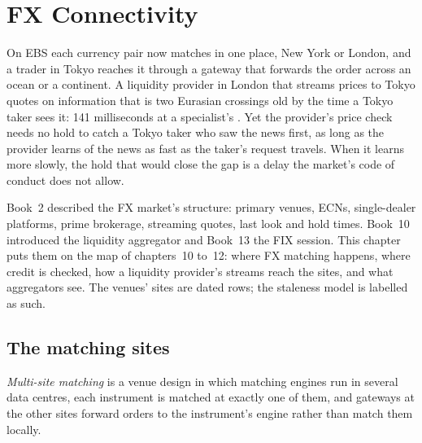 \chapter{FX Connectivity}\label{ch:nw:fx-connectivity}

On EBS each currency pair now matches in one place, New York or London, and a trader in Tokyo reaches it through a gateway
that forwards the order across an ocean or a continent. A liquidity provider in London that streams prices to Tokyo quotes on
information that is two Eurasian crossings old by the time a Tokyo taker sees it: 141 milliseconds at a specialist's . Yet the provider's price check needs no hold to catch a Tokyo taker who saw the news first, as long as the provider
learns of the news as fast as the taker's request travels. When it learns more slowly, the hold that would close the gap is a
delay the market's code of conduct does not allow.

Book~2 described the FX market's structure: primary venues, ECNs, single-dealer platforms, prime brokerage, streaming quotes,
last look and hold times. Book~10 introduced the liquidity aggregator and Book~13 the FIX session. This chapter puts them on the
map of chapters~10 to~12: where FX matching happens, where credit is checked, how a liquidity provider's streams reach the
sites, and what aggregators see. The venues' sites are dated rows; the staleness model is labelled as such.

\section{The matching sites}

\begin{definition}\label{def:nw:fx-connectivity:multisite}
\emph{Multi-site matching} is a venue design in which matching engines run in several data centres,
each instrument is matched at exactly one of them, and gateways at the other sites forward orders to the instrument's engine
rather than match them locally.
\end{definition}

